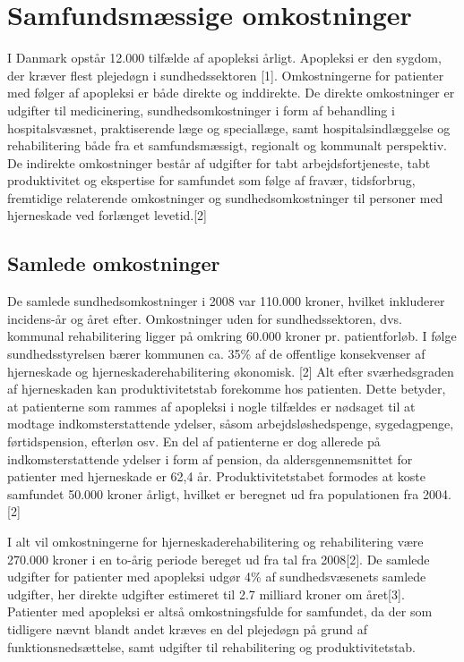 \section{Samfundsmæssige omkostninger}
I Danmark opstår 12.000 tilfælde af apopleksi årligt. Apopleksi er den sygdom, der kræver flest plejedøgn i sundhedssektoren [1]. %
Omkostningerne for patienter med følger af apopleksi er både direkte og inddirekte. De direkte omkostninger er udgifter til medicinering, sundhedsomkostninger i form af behandling i hospitalsvæsnet, praktiserende læge og speciallæge, samt hospitalsindlæggelse og rehabilitering både fra et samfundsmæssigt, regionalt og kommunalt perspektiv. De indirekte omkostninger  består af udgifter for tabt arbejdsfortjeneste, tabt produktivitet og ekspertise for samfundet som følge af fravær, tidsforbrug, fremtidige relaterende omkostninger og sundhedsomkostninger til personer med hjerneskade ved forlænget levetid.[2]

\subsection{Samlede omkostninger}
De samlede sundhedsomkostninger i 2008 var 110.000 kroner, hvilket inkluderer incidens-år og året efter. Omkostninger uden for sundhedssektoren, dvs. kommunal rehabilitering ligger på omkring 60.000 kroner pr. patientforløb. I følge sundhedsstyrelsen bærer kommunen ca. 35\% af de offentlige konsekvenser af hjerneskade og hjerneskaderehabilitering økonomisk. [2]    
Alt efter sværhedsgraden af hjerneskaden kan produktivitetstab forekomme hos patienten. Dette betyder, at patienterne som rammes af apopleksi i nogle tilfældes er nødsaget til at modtage indkomsterstattende ydelser, såsom arbejdsløshedspenge, sygedagpenge, førtidspension, efterløn osv. En del af patienterne er dog allerede på indkomsterstattende ydelser i form af pension, da aldersgennemsnittet for patienter med hjerneskade er 62,4 år. Produktivitetstabet formodes at koste samfundet 50.000 kroner årligt, hvilket er beregnet ud fra populationen fra 2004.[2] 

I alt vil omkostningerne for hjerneskaderehabilitering og rehabilitering være 270.000 kroner i en to-årig periode bereget ud fra tal fra 2008[2]. De samlede udgifter for patienter med apopleksi udgør 4\% af sundhedsvæsenets samlede udgifter, her direkte udgifter estimeret til 2.7 milliard kroner om året[3]. 
Patienter med apopleksi er altså omkostningsfulde for samfundet, da der som tidligere nævnt blandt andet kræves en del plejedøgn på grund af funktionsnedsættelse, samt udgifter til rehabilitering og produktivitetstab.

